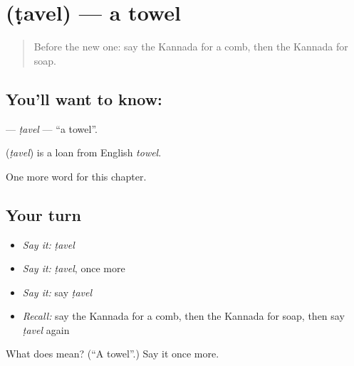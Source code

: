 \section[\texorpdfstring{\kn{ಟವೆಲ್} (ṭavel)}{ಟವೆಲ್ (ṭavel)}]{ (ṭavel) — a towel}

\label{lesson:KA-C117-tavel}



\begin{quote}
Before the new one: say the Kannada for a comb, then the Kannada for soap.
\end{quote}

\subsection*{You'll want to know: }
\textbf{} — \emph{ṭavel} — \textquotedblleft{}a towel\textquotedblright{}.

\begin{cousinweb}
\textbf{} (\emph{ṭavel}) is a loan from English \emph{towel}.
\end{cousinweb}

\begin{grammarlens}[title={What you've built}]
One more word for this chapter.
\end{grammarlens}

\subsection*{Your turn}
\begin{itemize}
\raggedright
  \item \emph{Say it:} \emph{ṭavel}
  \item \emph{Say it:} \emph{ṭavel}, once more
  \item \emph{Say it:} say \emph{ṭavel}
  \item \emph{Recall:} say the Kannada for a comb, then the Kannada for soap, then say \emph{ṭavel} again
\end{itemize}

\begin{tcolorbox}[breakable,colback=teal!4,colframe=teal!35!black,title={Before you move on}]
What does  mean? (\textquotedblleft{}A towel\textquotedblright{}.) Say it once more.
\end{tcolorbox}
